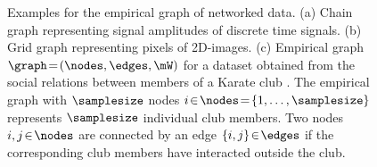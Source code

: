 \documentclass[12pt]{report}
\begin{document}
\begin{figure}[htbp]
\begin{center}
\begin{minipage}[b]{.8\textwidth} 
\begin{center}
\end{center}
\end{minipage}
\end{center}
\caption{\label{fig_graph_signals} Examples for the empirical graph of 
	networked data. (a) Chain graph representing signal amplitudes of 
	discrete time signals.  (b) Grid graph representing pixels of 2D-images. 
	(c) Empirical graph $\graph\!=\!(\nodes,\edges,\mW)$ for a dataset obtained 
from the social relations between members of a Karate club \cite{Zachary77}. 
The empirical graph with $\samplesize$ nodes $i \!\in\!\nodes\!=\!\{1,\ldots,\samplesize \}$ 
represents $\samplesize$ individual club members. Two nodes $i,j\!\in\!\nodes$ 
are connected by an edge $\{i,j\}\!\in\!\edges$ if the corresponding club members 
have interacted outside the club.}
\end{figure}
\end{document}
